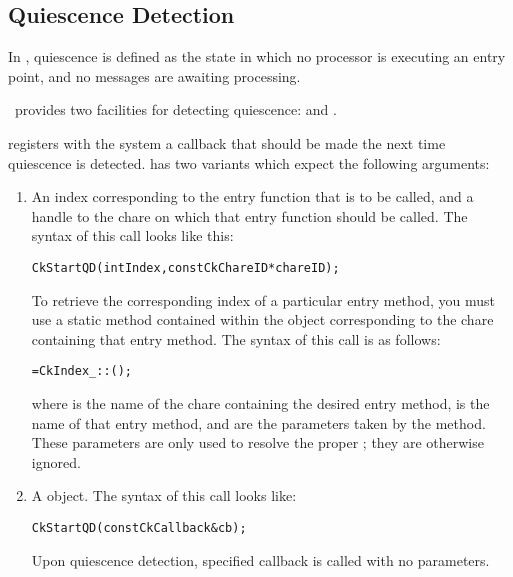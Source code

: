 \subsection{Quiescence Detection}

In \charmpp, quiescence is defined as the state in which no
processor is executing an entry point, and no messages are awaiting processing.

\charmpp\ provides two facilities for detecting quiescence:  and
.

 registers with the system a callback that should be made the
next time quiescence is detected.   has two
variants which expect the following arguments: 
\begin{enumerate}
\item An index corresponding to the entry function that is to be called,
and a handle to the chare on which that entry function should be called.  The
syntax of this call looks like this:

\begin{alltt}
 CkStartQD(int Index,const CkChareID* chareID);
\end{alltt}

To retrieve the corresponding index of a particular entry
method, you must use a static method contained within the  object
corresponding to the chare containing that entry method.  The
syntax of this call is as follows:

\begin{alltt}
=CkIndex_::();
\end{alltt}

where  is the name of the chare containing
the desired entry method,  is the name of that entry method,
and  are the parameters taken by the method.
These parameters are only used to resolve the proper ;
they are otherwise ignored.

\item A  object. The syntax of this call looks like:
\begin{alltt}
  CkStartQD(const CkCallback& cb);
\end{alltt}

Upon quiescence detection, specified callback is called with no parameters.
\end{enumerate}

